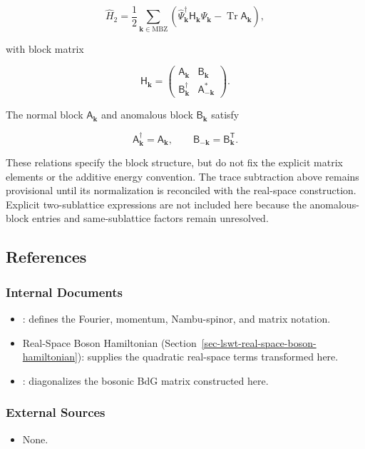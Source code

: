 \[
\hat H_2
=\frac12\sum_{\mathbf k\in\mathrm{MBZ}}
\left(
\hat\Psi_{\mathbf k}^\dagger\mathsf H_{\mathbf k}\hat\Psi_{\mathbf k}
-\operatorname{Tr}\mathsf A_{\mathbf k}
\right),
\]

with block matrix

\[
\mathsf H_{\mathbf k}
=\begin{pmatrix}
\mathsf A_{\mathbf k} & \mathsf B_{\mathbf k}\\
\mathsf B_{\mathbf k}^\dagger & \mathsf A_{-\mathbf k}^*
\end{pmatrix}.
\]

The normal block \(\mathsf A_{\mathbf k}\) and anomalous block \(\mathsf B_{\mathbf k}\) satisfy

\[
\mathsf A_{\mathbf k}^\dagger=\mathsf A_{\mathbf k},
\qquad
\mathsf B_{-\mathbf k}=\mathsf B_{\mathbf k}^{\mathsf T}.
\]

These relations specify the block structure, but do not fix the explicit matrix elements or the additive energy convention. The trace subtraction above remains provisional until its normalization is reconciled with the real-space construction. Explicit two-sublattice expressions are not included here because the anomalous-block entries and same-sublattice factors remain unresolved.

\subsection{References}

\subsubsection{Internal Documents}

\begin{itemize}
\tightlist
\item
  : defines the Fourier, momentum, Nambu-spinor, and matrix notation.
\item
  Real-Space Boson Hamiltonian (Section~\ref{sec-lswt-real-space-boson-hamiltonian}): supplies the quadratic real-space terms transformed here.
\item
  : diagonalizes the bosonic BdG matrix constructed here.
\end{itemize}

\subsubsection{External Sources}

\begin{itemize}
\tightlist
\item
  None.
\end{itemize}
